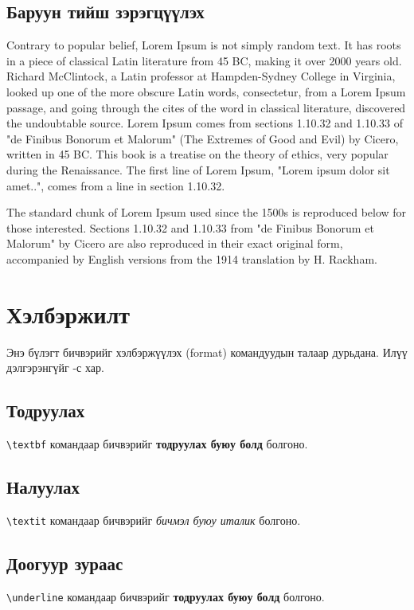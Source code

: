 \documentclass[12pt,A4]{report}
\begin{document}
\subsection{Баруун тийш зэрэгцүүлэх}
\begin{flushright}
	Contrary to popular belief, Lorem Ipsum is not simply random text. It has roots in a piece of classical Latin literature from 45 BC, making it over 2000 years old. Richard McClintock, a Latin professor at Hampden-Sydney College in Virginia, looked up one of the more obscure Latin words, consectetur, from a Lorem Ipsum passage, and going through the cites of the word in classical literature, discovered the undoubtable source. Lorem Ipsum comes from sections 1.10.32 and 1.10.33 of "de Finibus Bonorum et Malorum" (The Extremes of Good and Evil) by Cicero, written in 45 BC. This book is a treatise on the theory of ethics, very popular during the Renaissance. The first line of Lorem Ipsum, "Lorem ipsum dolor sit amet..", comes from a line in section 1.10.32.

	The standard chunk of Lorem Ipsum used since the 1500s is reproduced below for those interested. Sections 1.10.32 and 1.10.33 from "de Finibus Bonorum et Malorum" by Cicero are also reproduced in their exact original form, accompanied by English versions from the 1914 translation by H. Rackham.
\end{flushright}


\section{Хэлбэржилт}
Энэ бүлэгт бичвэрийг хэлбэржүүлэх (format) командуудын талаар дурьдана. Илүү дэлгэрэнгүйг \cite{format1}-с хар.

\subsection{Тодруулах}
\texttt{\textbackslash textbf} командаар бичвэрийг \textbf{тодруулах буюу болд} болгоно.

\subsection{Налуулах}
\texttt{\textbackslash textit} командаар бичвэрийг \textit{бичмэл буюу италик} болгоно.

\subsection{Доогуур зураас}
\texttt{\textbackslash underline} командаар бичвэрийг \textbf{тодруулах буюу болд} болгоно.
\end{document}
